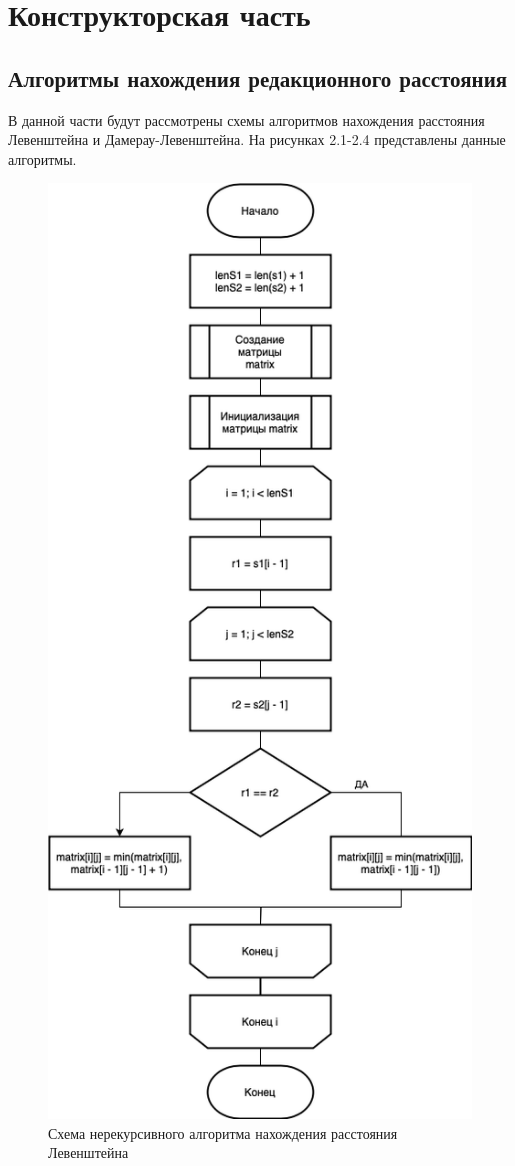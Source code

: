 \chapter{Конструкторская часть}

\section{Алгоритмы нахождения редакционного расстояния}


В данной части будут рассмотрены схемы алгоритмов нахождения расстояния Левенштейна и Дамерау-Левенштейна.
На рисунках 2.1-2.4 представлены данные алгоритмы.

\begin{figure}[h]
	\centering
	\includegraphics[width=0.46\linewidth]{img/L.png}
	\caption{Схема нерекурсивного алгоритма нахождения расстояния Левенштейна}
	\label{fig:mpr}
\end{figure}

\clearpage

